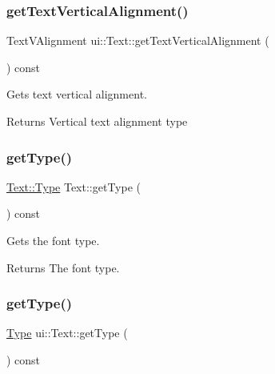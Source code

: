 \subsubsection{\texorpdfstring{get\+Text\+Vertical\+Alignment()}{getTextVerticalAlignment()}\hspace{0.1cm}{\footnotesize\ttfamily [2/2]}}
{\footnotesize\ttfamily Text\+V\+Alignment ui\+::\+Text\+::get\+Text\+Vertical\+Alignment (\begin{DoxyParamCaption}{ }\end{DoxyParamCaption}) const}

Gets text vertical alignment.

\begin{DoxyReturn}{Returns}
Vertical text alignment type 
\end{DoxyReturn}
\mbox{\label{classui_1_1Text_a4f95c69fb9ea4c6f8e0409cc86d804cb}} 
\subsubsection{\texorpdfstring{get\+Type()}{getType()}\hspace{0.1cm}{\footnotesize\ttfamily [1/2]}}
{\footnotesize\ttfamily \hyperlink{classui_1_1Text_a66074a2bf4b155f85115f944c6ff01ed}{Text\+::\+Type} Text\+::get\+Type (\begin{DoxyParamCaption}{ }\end{DoxyParamCaption}) const}

Gets the font type. \begin{DoxyReturn}{Returns}
The font type. 
\end{DoxyReturn}
\mbox{\label{classui_1_1Text_a09ed772f6954925301be452daedd882e}} 
\subsubsection{\texorpdfstring{get\+Type()}{getType()}\hspace{0.1cm}{\footnotesize\ttfamily [2/2]}}
{\footnotesize\ttfamily \hyperlink{classui_1_1Text_a66074a2bf4b155f85115f944c6ff01ed}{Type} ui\+::\+Text\+::get\+Type (\begin{DoxyParamCaption}{ }\end{DoxyParamCaption}) const}

